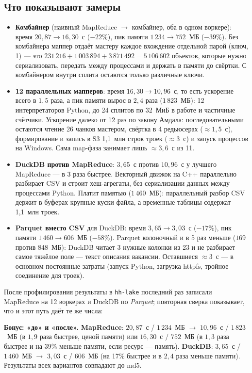 \subsection{Что показывают замеры}

\begin{itemize}
\item \textbf{Комбайнер} (наивный MapReduce $\to$ комбайнер, оба в одном воркере): время $20{,}87 \to 16{,}30$~с ($-22\%$), пик памяти $1\,234 \to 752$~МБ ($-39\%$). Без комбайнера маппер отдаёт мастеру каждое вхождение отдельной парой (ключ, 1) --- это $231\,216 + 1\,003\,894 + 3\,871\,492 = 5\,106\,602$ объектов, которые нужно сериализовать, передать между процессами и держать в памяти до свёртки. С комбайнером внутри сплита остаются только различные ключи.
\item \textbf{12 параллельных мапперов}: время $16{,}30 \to 10{,}96$~с, то есть ускорение всего в $1{,}5$ раза, а пик памяти вырос в $2{,}4$ раза ($1\,823$~МБ): 12 интерпретаторов Python, до 24 сплитов по 32~МиБ в работе и частичные счётчики. Ускорение далеко от 12 раз по закону Амдала: последовательными остаются чтение 26 чанков мастером, свёртка в 4 редьюсерах ($\approx1{,}5$~с), формирование и запись в S3 1,1~млн строк троек ($\approx3$~с) и запуск процессов на Windows. Сама map-фаза занимает лишь $\approx3{,}6$~с из 11.
\item \textbf{DuckDB против MapReduce}: $3{,}65$~с против $10{,}96$~с у лучшего MapReduce --- в 3 раза быстрее. Векторный движок на C++ параллельно разбирает CSV и строит хеш-агрегаты, без сериализации данных между процессами Python. Платит памятью ($1\,460$~МБ): параллельный разбор CSV держит в буферах крупные куски файла, а временные таблицы содержат 1,1~млн троек.
\item \textbf{Parquet вместо CSV} для DuckDB: время $3{,}65 \to 3{,}03$~с ($-17\%$), пик памяти $1\,460 \to 606$~МБ ($-58\%$). Parquet колоночный и в 5 раз меньше ($169$ против $848$~МБ): DuckDB читает 3 нужные колонки из 23 и не разбирает самое тяжёлое поле --- текст описания вакансии. Оставшиеся $\approx3$~с --- в основном постоянные затраты (запуск Python, загрузка httpfs, тройное соединение для троек).
\end{itemize}


После профилирования результаты в \texttt{hh-lake} последний раз записали MapReduce на 12 воркерах и DuckDB по \emph{Parquet}; повторная сверка показывает, что и этот путь даёт те же числа:


\begin{callout}
\textbf{Бонус: «до» и «после».}
\textbf{MapReduce}: $20{,}87$~с / $1\,234$~МБ $\to$ $10{,}96$~с / $1\,823$~МБ (в $1{,}9$ раза быстрее, ценой памяти) или $16{,}30$~с / $752$~МБ (в $1{,}3$ раза быстрее и на 39\% меньше памяти, если ресурс --- память).
\textbf{DuckDB}: $3{,}65$~с / $1\,460$~МБ $\to$ $3{,}03$~с / $606$~МБ (на 17\% быстрее и в $2{,}4$ раза меньше памяти).
Результаты всех вариантов совпадают до md5.
\end{callout}
